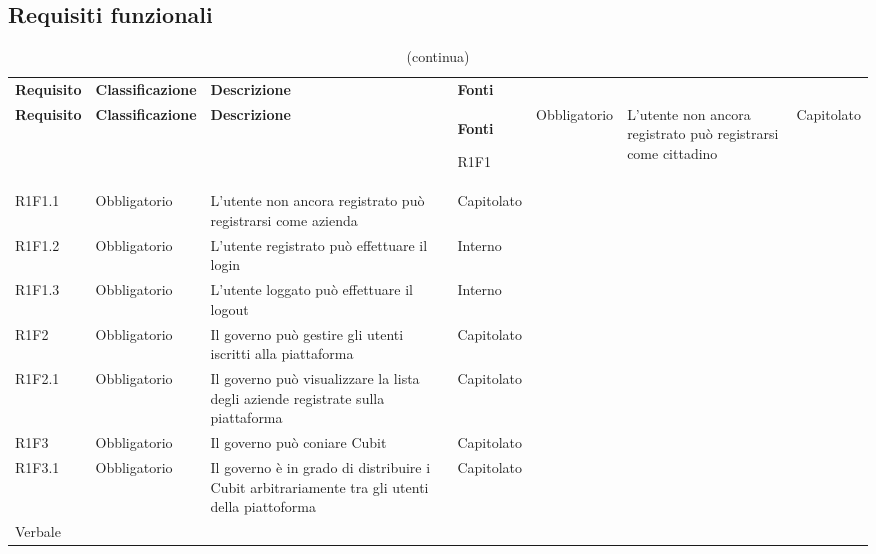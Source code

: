 \subsection{Requisiti funzionali}

	
	\begin{longtable}{ >{\centering}p{} >{\centering}p{}
			>{\raggedright}p{} >{\centering}p{}}
		\caption{Tabella dei requisiti funzionali}\\
		\rowcolorhead 
		\textbf{\color{white}Requisito} 
		& \textbf{\color{white}Classificazione} 
		& \centering\textbf{\color{white}Descrizione}
		& \textbf{\color{white}Fonti} 
			\endfirsthead
		\caption{(continua)}\\
		\rowcolorhead 
		\textbf{\color{white}Requisito} 
		& \textbf{\color{white}Classificazione} 
		& \centering\textbf{\color{white}Descrizione}
		& \textbf{\color{white}Fonti} 
		\endhead	
		
		R1F1 & Obbligatorio & L'utente non ancora registrato può registrarsi come cittadino 
		& Capitolato
		\tabularnewline
		R1F1.1 & Obbligatorio & L'utente non ancora registrato può registrarsi come azienda 
		& Capitolato
		\tabularnewline
		R1F1.2 & Obbligatorio & L'utente registrato può effettuare il login &
		Interno
		\tabularnewline
		R1F1.3 & Obbligatorio & L'utente loggato può effettuare il logout & Interno
		\tabularnewline
		
		R1F2 & Obbligatorio & Il governo può gestire gli utenti iscritti alla piattaforma  & Capitolato
		\tabularnewline
		R1F2.1 & Obbligatorio & Il governo può visualizzare la lista degli aziende registrate sulla piattaforma & Capitolato
		\tabularnewline
		R1F3 & Obbligatorio & Il governo può coniare Cubit & Capitolato 
		\tabularnewline 
		R1F3.1 & Obbligatorio & Il governo è in grado di distribuire i Cubit arbitrariamente tra gli utenti della piattoforma & Capitolato \\ Verbale
		\tabularnewline
		
		
		
		
	\end{longtable}

